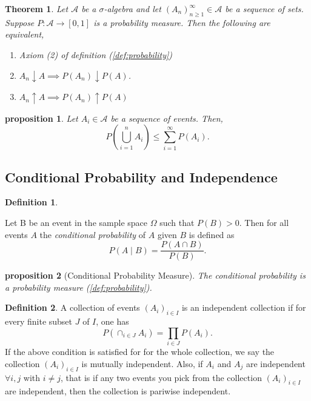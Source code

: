 \documentclass{article}
\newtheorem{theorem}{Theorem}[section]
\newtheorem{proposition}{Proposition}[section]
\newtheorem{proposition}{proposition}[section]
\theoremstyle{definition}
\newtheorem{definition}{Definition}[section]
\theoremstyle{remark}
\begin{document}
\begin{theorem}\label{thm:convergence of P of seq of sets}
Let $\mathcal{A}$ be a $\sigma$-algebra and let $(A_n)^\infty_{n\geq 1} \in \mathcal{A}$ be a sequence of sets. Suppose $P: \mathcal{A}\to [0,1]$ is a probability measure.
Then the following are equivalent, 
\begin{enumerate}
\item Axiom (2) of definition (\ref{def:probability})
\item $A_n \downarrow A \implies P(A_n) \downarrow P(A)$.
\item $A_n \uparrow A \implies P(A_n) \uparrow P(A)$
\end{enumerate}
\end{theorem}




\begin{proposition}
Let $A_i \in \mathcal{A}$ be a sequence of events. Then, 
\[
P\left(\bigcup_{i=1}^{n} A_i \right) \leq \sum_{i=1}^{\infty} P(A_i).
\]
\end{proposition}





\subsection{Conditional Probability and Independence}


\begin{definition} \label{def: conditional_prob}


Let B be an event in the sample space \(\Omega\) such that \(P(B) > 0\). Then for all events \(A\) the \textit{conditional probability} of \(A\) given \(B\) is defined as
\[
P(A \mid B) = \frac{P(A \cap B)}{P(B)}.
\]

\end{definition}

\begin{proposition}[Conditional Probability Measure]\label{prop:conditional prob is a prob measure}
The conditional probability is a probability measure (\ref{def:probability}).
\end{proposition}





\begin{definition}\label{def: independence}
A collection of events $(A_i)_{i \in I}$ is an independent collection if for every finite subset $J$ of $I$, one has 
\[
P(\cap_{i \in J}{A_i}) = \prod_{i \in J}{P(A_i)}.
\]
If the above condition is satisfied for for the whole collection, we say the collection $(A_i)_{i \in I}$ is mutually independent. Also, 
if $A_i$ and $A_j$ are independent $\forall i,j$ with $i \neq j$, that is if any two events you pick from the collection $(A_i)_{i \in I}$ are independent, then the collection is pariwise independent.

\end{definition}
\end{document}
